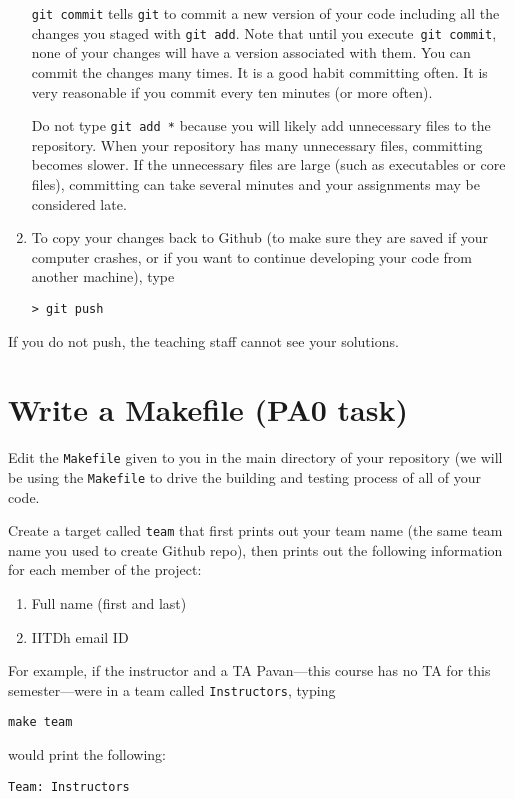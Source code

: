 \documentclass{article}
\begin{document}
\begin{enumerate}
\texttt{git commit} tells \texttt{git} to commit a new version of your code including all the changes you staged with \texttt{git add}. Note that until you execute\texttt{ git commit}, none of your changes will have a version associated with them. You can commit the changes many times. It is a good habit committing often. It is very reasonable if you commit every ten minutes (or more often).

Do not type \texttt{git add *} because you will likely add unnecessary files to the repository. When your repository has many unnecessary files, committing becomes slower. If the unnecessary files are large (such as executables or core files), committing can take several minutes and your assignments may be considered late.

\item To copy your changes back to Github (to make sure they are saved if your computer crashes, or if you want to continue developing your code from another machine), type

\texttt{> git push}
\end{enumerate}

If you do not push, the teaching staff cannot see your solutions.

\section{Write a Makefile (PA0 task)}
Edit the \texttt{Makefile} given to you in the main directory of your repository (we will be using the \texttt{Makefile} to drive the building and testing process of all of your code.

Create a target called \texttt{team} that first prints out your team name  (the same team name you used to create Github repo), then prints out the following information for each member of the project:

\begin{enumerate}
	\item Full name  (first and last)
	\item IITDh email ID 
\end{enumerate}

For example, if the instructor and a TA Pavan---this course has no TA for this semester---were in a team called \texttt{Instructors}, typing

\texttt{make team}

would print the following:

\begin{lstlisting}[numbers=none]
Team: Instructors
\end{lstlisting}
\end{document}
